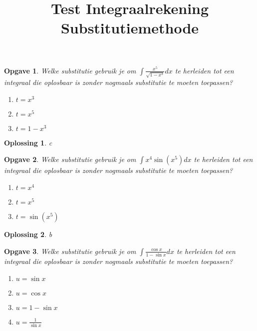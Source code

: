 \documentclass{article}
\title{Test Integraalrekening Substitutiemethode}
\date { }
\newtheorem{opgave}{Opgave}
\newtheorem*{oplossing}{Oplossing}
\begin{document}
\maketitle \noindent

\begin{opgave}
Welke substitutie gebruik je om $\int \frac{x^5}{\sqrt{1-x^3}}dx$ te herleiden tot een integraal die oplosbaar is zonder nogmaals substitutie te moeten toepassen?

\vspace{2mm}
\begin{enumerate}[a]
\item $t=x^3$
\item $t=x^5$
\item $t=1-x^3$
\end{enumerate}
\end{opgave}

 \begin{oplossing}
c
\end{oplossing}

\begin{opgave}
Welke substitutie gebruik je om $\int x^4 \sin (x^5)dx$ te herleiden tot een integraal die oplosbaar is zonder nogmaals substitutie te moeten toepassen?

\begin{enumerate}[a]
\item $t=x^4$
\item $t=x^5$
\item $t=\sin(x^5)$
\end{enumerate}
\end{opgave}

\begin{oplossing}
b
\end{oplossing}

\begin{opgave}
Welke substitutie gebruik je om $\int \frac{\cos x}{1-\sin x}dx$ te herleiden tot een integraal die oplosbaar is zonder nogmaals substitutie te moeten toepassen?

\begin{enumerate}[a]
\item $u=\sin x$
\item $u=\cos x$
\item $u=1-\sin x$
\item $u=\frac{1}{\sin x}$
\end{enumerate}

\end{opgave}
\end{document}
